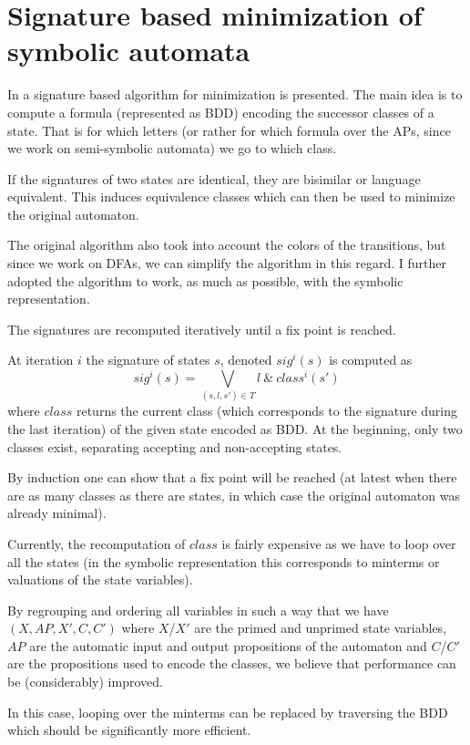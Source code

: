 \documentclass[11pt]{article}
\begin{document}
\section{Signature based minimization of symbolic automata}

In \cite{babiak.13.spin} a signature based algorithm for minimization is presented.
The main idea is to compute a formula (represented as BDD) encoding the
successor classes of a state. That is for which letters (or rather for
which formula over the APs, since we work on semi-symbolic automata) we
go to which class.

If the signatures of two states are identical, they are bisimilar or
language equivalent. This induces equivalence classes which can then
be used to minimize the original automaton.

The original algorithm also took into account the colors
of the transitions, but since we work on DFAs, we can simplify
the algorithm in this regard.
I further adopted the algorithm to work, as much as possible, with the
symbolic representation.

The signatures are recomputed iteratively until a fix point is reached.

At iteration $i$ the signature of states $s$, denoted $sig^i(s)$ is computed as
\begin{equation}
    sig^i(s) = \bigvee_{(s,l,s') \in T} l\ \&\  class^i(s')
\end{equation}
where $class$ returns the current class (which corresponds to the
signature during the last iteration) of the given state encoded as BDD.
At the beginning, only two classes exist, separating accepting and non-accepting
states.

By induction one can show that a fix point will be reached (at latest when
there are as many classes as there are states, in which case the original automaton
was already minimal).

Currently, the recomputation of $class$ is fairly expensive as we have to loop
over all the states (in the symbolic representation this corresponds
to minterms or valuations of the state variables).

By regrouping and ordering all variables in such a way that we have
$(X, AP, X', C, C')$ where $X$/$X'$ are the primed and unprimed state
variables, $AP$ are the automatic input and output propositions of the
automaton and $C$/$C'$ are the propositions used to encode the classes,
we believe that performance can be (considerably) improved.

In this case, looping over the minterms can be replaced by traversing the
BDD which should be significantly more efficient.





\end{document}
